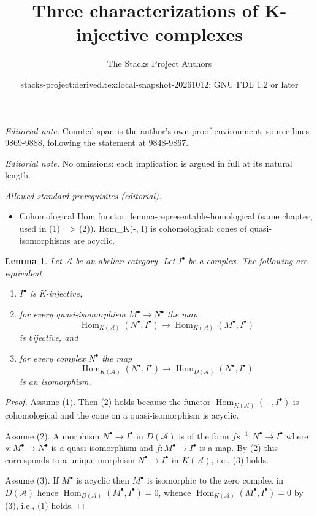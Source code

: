 \documentclass{stacks-project}
\title{Three characterizations of K-injective complexes}
\author{The Stacks Project Authors}
\date{stacks-project:derived.tex:local-snapshot-20261012; GNU FDL 1.2 or later}
\theoremstyle{plain}
\newtheorem{lemma}[subsection]{Lemma}
\theoremstyle{definition}
\theoremstyle{remark}
\numberwithin{equation}{subsection}
\def\Hom{\mathop{\mathrm{Hom}}\nolimits}
\begin{document}
\maketitle
\noindent\textit{Editorial note.} Counted span is the author's own proof environment, source lines 9869-9888, following the statement at 9848-9867.\par\medskip
\noindent\textit{Editorial note.} No omissions: each implication is argued in full at its natural length.\par\medskip
\noindent\textit{Allowed standard prerequisites (editorial).}\begin{itemize}
\item Cohomological Hom functor. lemma-representable-homological (same chapter, used in (1) => (2)). Hom\_K(-, I) is cohomological; cones of quasi-isomorphisms are acyclic.
\end{itemize}\medskip
\begin{lemma}
\label{lemma-K-injective}
Let $\mathcal{A}$ be an abelian category.
Let $I^\bullet$ be a complex. The following are equivalent
\begin{enumerate}
\item $I^\bullet$ is K-injective,
\item for every quasi-isomorphism $M^\bullet \to N^\bullet$ the map
$$
\Hom_{K(\mathcal{A})}(N^\bullet, I^\bullet)
\to \Hom_{K(\mathcal{A})}(M^\bullet, I^\bullet)
$$
is bijective, and
\item for every complex $N^\bullet$ the map
$$
\Hom_{K(\mathcal{A})}(N^\bullet, I^\bullet)
\to \Hom_{D(\mathcal{A})}(N^\bullet, I^\bullet)
$$
is an isomorphism.
\end{enumerate}
\end{lemma}

\begin{proof}
Assume (1). Then (2) holds because the functor
$\Hom_{K(\mathcal{A})}( - , I^\bullet)$ is cohomological
and the cone on a quasi-isomorphism is acyclic.

\medskip\noindent
Assume (2). A morphism $N^\bullet \to I^\bullet$ in $D(\mathcal{A})$
is of the form $fs^{-1} : N^\bullet \to I^\bullet$ where
$s : M^\bullet \to N^\bullet$ is a quasi-isomorphism and
$f : M^\bullet \to I^\bullet$ is a map. By (2) this corresponds to
a unique morphism $N^\bullet \to I^\bullet$ in $K(\mathcal{A})$, i.e.,
(3) holds.

\medskip\noindent
Assume (3). If $M^\bullet$ is acyclic then $M^\bullet$ is isomorphic
to the zero complex in $D(\mathcal{A})$ hence
$\Hom_{D(\mathcal{A})}(M^\bullet, I^\bullet) = 0$, whence
$\Hom_{K(\mathcal{A})}(M^\bullet, I^\bullet) = 0$ by (3),
i.e., (1) holds.
\end{proof}
\end{document}
